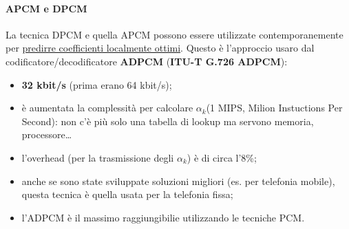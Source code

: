 \documentclass{article}
\begin{document}
				\paragraph{APCM e DPCM}
					La tecnica DPCM e quella APCM possono essere utilizzate contemporanemente per \underline{predirre coefficienti localmente ottimi}. Questo è l'approccio usaro dal codificatore/decodificatore \textbf{ADPCM} (\textbf{ITU-T G.726 ADPCM}):
					\begin{itemize}
						\item \textbf{32 kbit/s} (prima erano 64 kbit/s);
						\item è aumentata la complessità per calcolare \textit{$\alpha_{k}$}(1 MIPS, Milion Instuctions Per Second): non c'è più solo una tabella di lookup ma servono memoria, processore\dots
						\newpage
						\item l'overhead (per la trasmissione degli \textit{$\alpha_{k}$}) è di circa l'8\%;
						\begin{figure}[ht!]
						\end{figure}
						\item anche se sono state sviluppate soluzioni migliori (es. per telefonia mobile), questa tecnica è quella usata per la telefonia fissa;
						\item l'ADPCM è il massimo raggiungibilie utilizzando le tecniche PCM.
					\end{itemize}

			
\end{document}
